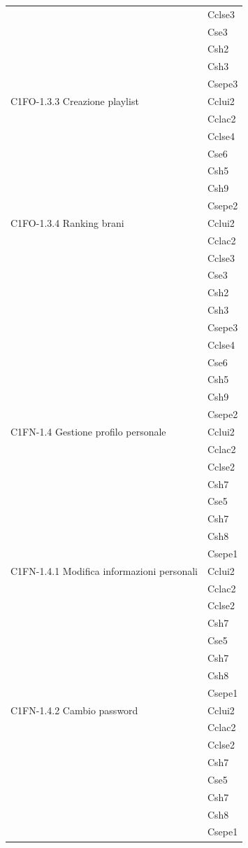\begin{footnotesize}
\begin{longtable}[!h]{|l|l|}
& Cclse3\\
& Cse3\\
& Csh2\\
& Csh3\\
& Csepe3\\\hline   
C1FO-1.3.3 Creazione playlist & Cclui2\\
& Cclac2\\
& Cclse4\\
& Cse6\\
& Csh5\\
& Csh9\\
& Csepe2\\\hline  
C1FO-1.3.4 Ranking brani & Cclui2\\
& Cclac2\\
& Cclse3\\
& Cse3\\
& Csh2\\
& Csh3\\
& Csepe3\\
& Cclse4\\
& Cse6\\
& Csh5\\
& Csh9\\
& Csepe2  \\\hline             
C1FN-1.4 Gestione profilo personale & Cclui2\\
& Cclac2\\
& Cclse2\\
& Csh7\\
& Cse5\\
& Csh7\\
& Csh8\\
& Csepe1\\\hline 
C1FN-1.4.1 Modifica informazioni personali & Cclui2\\
& Cclac2\\
& Cclse2\\
& Csh7\\
& Cse5\\
& Csh7\\
& Csh8\\
& Csepe1\\\hline  
C1FN-1.4.2 Cambio password & Cclui2 \\
& Cclac2\\
& Cclse2\\
& Csh7\\
& Cse5\\
& Csh7\\
& Csh8\\
& Csepe1\\

\end{longtable}
\end{footnotesize}
